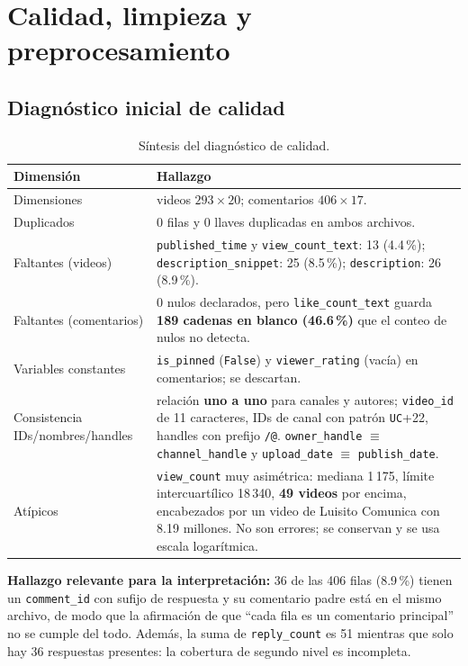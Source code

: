 \documentclass[11pt,a4paper]{article}
\begin{document}
\section{Calidad, limpieza y preprocesamiento}

\subsection{Diagn\'ostico inicial de calidad}
\begin{table}[H]
\centering
\caption{S\'intesis del diagn\'ostico de calidad.}
\begin{tabular}{p{4.3cm} p{10.5cm}}
\toprule
\textbf{Dimensi\'on} & \textbf{Hallazgo} \\
\midrule
Dimensiones & videos $293\times20$; comentarios $406\times17$. \\
Duplicados & 0 filas y 0 llaves duplicadas en ambos archivos. \\
Faltantes (videos) & \texttt{published\_time} y \texttt{view\_count\_text}: 13 (4.4\,\%);
  \texttt{description\_snippet}: 25 (8.5\,\%); \texttt{description}: 26 (8.9\,\%). \\
Faltantes (comentarios) & 0 nulos declarados, pero \texttt{like\_count\_text} guarda
  \textbf{189 cadenas en blanco (46.6\,\%)} que el conteo de nulos no detecta. \\
Variables constantes & \texttt{is\_pinned} (\texttt{False}) y \texttt{viewer\_rating} (vac\'ia)
  en comentarios; se descartan. \\
Consistencia IDs/nombres/handles & relaci\'on \textbf{uno a uno} para canales y autores;
  \texttt{video\_id} de 11 caracteres, IDs de canal con patr\'on \texttt{UC}+22, handles con
  prefijo \texttt{/@}. \texttt{owner\_handle} $\equiv$ \texttt{channel\_handle} y
  \texttt{upload\_date} $\equiv$ \texttt{publish\_date}. \\
At\'ipicos & \texttt{view\_count} muy asim\'etrica: mediana 1\,175, l\'imite intercuart\'ilico
  18\,340, \textbf{49 videos} por encima, encabezados por un video de Luisito Comunica con
  8.19 millones. No son errores; se conservan y se usa escala logar\'itmica. \\
\bottomrule
\end{tabular}
\end{table}

\textbf{Hallazgo relevante para la interpretaci\'on:} 36 de las 406 filas (8.9\,\%) tienen un
\texttt{comment\_id} con sufijo de respuesta y su comentario padre est\'a en el mismo archivo, de modo
que la afirmaci\'on de que ``cada fila es un comentario principal'' no se cumple del todo. Adem\'as, la
suma de \texttt{reply\_count} es 51 mientras que solo hay 36 respuestas presentes: la cobertura de
segundo nivel es incompleta.
\end{document}
